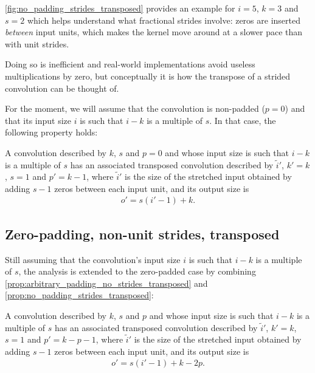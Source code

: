 \documentclass{article}
\begin{document}
\autoref{fig:no_padding_strides_transposed} provides an example for $i = 5$, $k
= 3$ and $s = 2$ which helps understand what fractional strides involve: zeros
are inserted {\em between} input units, which makes the kernel move around at a
slower pace than with unit strides.

Doing so is inefficient and real-world implementations avoid useless
multiplications by zero, but conceptually it is how the transpose of a strided
convolution can be thought of.

For the moment, we will assume that the convolution is non-padded ($p = 0$) and
that its input size $i$ is such that $i - k$ is a multiple of $s$. In that case,
the following property holds:

\begin{prop}\label{prop:no_padding_strides_transposed}
A convolution described by $k$, $s$ and $p = 0$ and whose input size is such
that $i - k$ is a multiple of $s$ has an associated transposed convolution
described by $\tilde{i}'$, $k' = k$, $s = 1$ and $p' = k - 1$, where
$\tilde{i}'$ is the size of the stretched input obtained by adding $s - 1$ zeros
between each input unit, and its output size is
\begin{equation*}
\begin{split}
    o' = s (i' - 1) + k.
\end{split}
\end{equation*}
\end{prop}

\subsection{Zero-padding, non-unit strides, transposed}

Still assuming that the convolution's input size $i$ is such that $i - k$ is a
multiple of $s$, the analysis is extended to the zero-padded case by combining
\autoref{prop:arbitrary_padding_no_strides_transposed} and
\autoref{prop:no_padding_strides_transposed}:

\begin{prop}\label{prop:padding_strides_transposed}
A convolution described by $k$, $s$ and $p$ and whose input size is such
that $i - k$ is a multiple of $s$ has an associated transposed convolution
described by $\tilde{i}'$, $k' = k$, $s = 1$ and $p' = k - p - 1$, where
$\tilde{i}'$ is the size of the stretched input obtained by adding $s - 1$ zeros
between each input unit, and its output size is
\begin{equation*}
\begin{split}
    o' = s (i' - 1) + k - 2p.
\end{split}
\end{equation*}
\end{prop}
\end{document}
